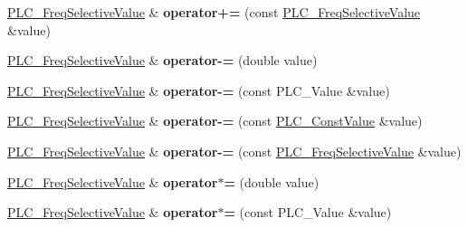 \begin{DoxyCompactItemize}
\item 
\hypertarget{classns3_1_1PLC__FreqSelectiveValue_ac9a02fbc9cc6774237d733f74603adc9}{\hyperlink{classns3_1_1PLC__FreqSelectiveValue}{\-P\-L\-C\-\_\-\-Freq\-Selective\-Value} \& {\bfseries operator+=} (const \hyperlink{classns3_1_1PLC__FreqSelectiveValue}{\-P\-L\-C\-\_\-\-Freq\-Selective\-Value} \&value)}\label{classns3_1_1PLC__FreqSelectiveValue_ac9a02fbc9cc6774237d733f74603adc9}

\item 
\hypertarget{classns3_1_1PLC__FreqSelectiveValue_a05d38a89bc6d9d7b198246a0c4c9c79d}{\hyperlink{classns3_1_1PLC__FreqSelectiveValue}{\-P\-L\-C\-\_\-\-Freq\-Selective\-Value} \& {\bfseries operator-\/=} (double value)}\label{classns3_1_1PLC__FreqSelectiveValue_a05d38a89bc6d9d7b198246a0c4c9c79d}

\item 
\hypertarget{classns3_1_1PLC__FreqSelectiveValue_a829d3dc5dbb5c7d6b3e0e87cdd4bea9b}{\hyperlink{classns3_1_1PLC__FreqSelectiveValue}{\-P\-L\-C\-\_\-\-Freq\-Selective\-Value} \& {\bfseries operator-\/=} (const \-P\-L\-C\-\_\-\-Value \&value)}\label{classns3_1_1PLC__FreqSelectiveValue_a829d3dc5dbb5c7d6b3e0e87cdd4bea9b}

\item 
\hypertarget{classns3_1_1PLC__FreqSelectiveValue_ae4bb931511e4350e2d8d8673fbf6cea8}{\hyperlink{classns3_1_1PLC__FreqSelectiveValue}{\-P\-L\-C\-\_\-\-Freq\-Selective\-Value} \& {\bfseries operator-\/=} (const \hyperlink{classns3_1_1PLC__ConstValue}{\-P\-L\-C\-\_\-\-Const\-Value} \&value)}\label{classns3_1_1PLC__FreqSelectiveValue_ae4bb931511e4350e2d8d8673fbf6cea8}

\item 
\hypertarget{classns3_1_1PLC__FreqSelectiveValue_a2e24be374cbfc6201127e9d1f7bd2288}{\hyperlink{classns3_1_1PLC__FreqSelectiveValue}{\-P\-L\-C\-\_\-\-Freq\-Selective\-Value} \& {\bfseries operator-\/=} (const \hyperlink{classns3_1_1PLC__FreqSelectiveValue}{\-P\-L\-C\-\_\-\-Freq\-Selective\-Value} \&value)}\label{classns3_1_1PLC__FreqSelectiveValue_a2e24be374cbfc6201127e9d1f7bd2288}

\item 
\hypertarget{classns3_1_1PLC__FreqSelectiveValue_af202c77476764f7d5e9cebb5f70e9750}{\hyperlink{classns3_1_1PLC__FreqSelectiveValue}{\-P\-L\-C\-\_\-\-Freq\-Selective\-Value} \& {\bfseries operator$\ast$=} (double value)}\label{classns3_1_1PLC__FreqSelectiveValue_af202c77476764f7d5e9cebb5f70e9750}

\item 
\hypertarget{classns3_1_1PLC__FreqSelectiveValue_a9355bb719c8f54fb5fe7485d7d04c247}{\hyperlink{classns3_1_1PLC__FreqSelectiveValue}{\-P\-L\-C\-\_\-\-Freq\-Selective\-Value} \& {\bfseries operator$\ast$=} (const \-P\-L\-C\-\_\-\-Value \&value)}\label{classns3_1_1PLC__FreqSelectiveValue_a9355bb719c8f54fb5fe7485d7d04c247}


\end{DoxyCompactItemize}
